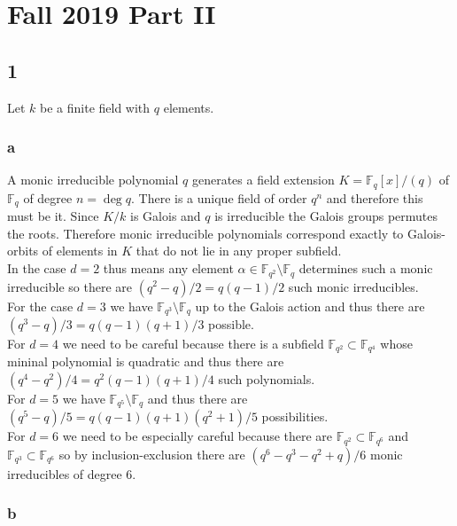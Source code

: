 \documentclass[12pt]{article}
\renewcommand{\F}{\mathbb{F}}
\begin{document}
\section{Fall 2019 Part II}

\subsection{1}

Let $k$ be a finite field with $q$ elements.

\subsubsection{a}

A monic irreducible polynomial $q$ generates a field extension $K = \F_q[x]/(q)$ of $\F_q$ of degree $n = \deg{q}$. There is a unique field of order $q^n$ and therefore this must be it. Since $K/k$ is Galois and $q$ is irreducible the Galois groups permutes the roots. Therefore monic irreducible polynomials correspond exactly to Galois-orbits of elements in $K$ that do not lie in any proper subfield.
\bigskip\\
In the case $d = 2$ thus means any element $\alpha \in \F_{q^2} \setminus \F_q$ determines such a monic irreducible so there are $(q^2 - q)/2 = q(q-1)/2$ such monic irreducibles.
\bigskip\\
For the case $d = 3$ we have $\F_{q^3} \setminus \F_q$ up to the Galois action and thus there are $(q^3 - q)/3 = q(q-1)(q+1)/3$ possible.
\bigskip\\
For $d = 4$ we need to be careful because there is a subfield $\F_{q^2} \subset \F_{q^4}$ whose mininal polynomial is quadratic and thus there are $(q^4 - q^2)/4 = q^2(q-1)(q+1)/4$ such polynomials.
\bigskip\\
For $d = 5$ we have $\F_{q^5} \setminus \F_q$ and thus there are $(q^5 - q)/5 = q(q-1)(q+1)(q^2+1)/5$ possibilities.
\bigskip\\
For $d = 6$ we need to be especially careful because there are $\F_{q^2} \subset \F_{q^6}$ and $\F_{q^3} \subset \F_{q^6}$ so by inclusion-exclusion there are $(q^6 - q^3 - q^2 + q)/6$ monic irreducibles of degree $6$.

\subsubsection{b}
\end{document}
